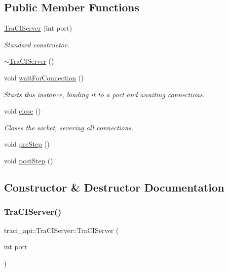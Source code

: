 \subsection*{Public Member Functions}
\begin{DoxyCompactItemize}
\item 
\hyperlink{classtraci__api_1_1_tra_c_i_server_a9960233a10a2c3790c375f91eec00b12}{Tra\+C\+I\+Server} (int port)
\begin{DoxyCompactList}\small\item\em Standard constructor. \end{DoxyCompactList}\item 
\hyperlink{classtraci__api_1_1_tra_c_i_server_a8ddc7d9ea6812c937cdaa06a00026eba}{$\sim$\+Tra\+C\+I\+Server} ()
\item 
void \hyperlink{classtraci__api_1_1_tra_c_i_server_ac9cc474ec4ae6277c82cbf80f212852e}{wait\+For\+Connection} ()
\begin{DoxyCompactList}\small\item\em Starts this instance, binding it to a port and awaiting connections. \end{DoxyCompactList}\item 
void \hyperlink{classtraci__api_1_1_tra_c_i_server_a1fd920907cde7ef5a10d078aec34080a}{close} ()
\begin{DoxyCompactList}\small\item\em Closes the socket, severing all connections. \end{DoxyCompactList}\item 
void \hyperlink{classtraci__api_1_1_tra_c_i_server_a8cd79e7da542e4abccc75d4933331d20}{pre\+Step} ()
\item 
void \hyperlink{classtraci__api_1_1_tra_c_i_server_af4814a9a99d79f4e00fc102169d10cc2}{post\+Step} ()
\end{DoxyCompactItemize}


\subsection{Constructor \& Destructor Documentation}
\mbox{\label{classtraci__api_1_1_tra_c_i_server_a9960233a10a2c3790c375f91eec00b12}} 
\subsubsection{\texorpdfstring{Tra\+C\+I\+Server()}{TraCIServer()}}
{\footnotesize\ttfamily traci\+\_\+api\+::\+Tra\+C\+I\+Server\+::\+Tra\+C\+I\+Server (\begin{DoxyParamCaption}\item[{int}]{port }\end{DoxyParamCaption})}



